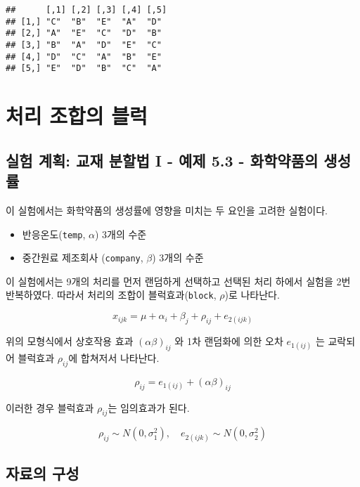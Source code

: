 \documentclass[
]{book}
\providecommand{\tightlist}{%
  \setlength{\itemsep}{0pt}\setlength{\parskip}{0pt}}
\begin{document}
\begin{verbatim}
##      [,1] [,2] [,3] [,4] [,5]
## [1,] "C"  "B"  "E"  "A"  "D" 
## [2,] "A"  "E"  "C"  "D"  "B" 
## [3,] "B"  "A"  "D"  "E"  "C" 
## [4,] "D"  "C"  "A"  "B"  "E" 
## [5,] "E"  "D"  "B"  "C"  "A"
\end{verbatim}

\hypertarget{ex53}{%
\chapter{처리 조합의 블럭}\label{ex53}}

\hypertarget{uxc2e4uxd5d8-uxacc4uxd68d-uxad50uxc7ac-uxbd84uxd560uxbc95-i---uxc608uxc81c-5.3---uxd654uxd559uxc57duxd488uxc758-uxc0dduxc131uxb960}{%
\section{실험 계획: 교재 분할법 I - 예제 5.3 - 화학약품의 생성률}\label{uxc2e4uxd5d8-uxacc4uxd68d-uxad50uxc7ac-uxbd84uxd560uxbc95-i---uxc608uxc81c-5.3---uxd654uxd559uxc57duxd488uxc758-uxc0dduxc131uxb960}}

이 실험에서는 화학약품의 생성률에 영향을 미치는 두 요인을 고려한 실험이다.

\begin{itemize}
\tightlist
\item
  반응온도(\texttt{temp}, \(\alpha\)) 3개의 수준
\item
  중간원료 제조회사 (\texttt{company}, \(\beta\)) 3개의 수준
\end{itemize}

이 실험에서는 9개의 처리를 먼저 랜덤하게 선택하고 선택된 처리 하에서 실험을 2번 반복하였다.
따라서 처리의 조합이 블럭효과(\texttt{block}, \(\rho\))로 나타난다.

\[ x_{ijk} = \mu + \alpha_i + \beta_j + \rho_{ij} + e_{2(ijk)} \]

위의 모형식에서 상호작용 효과 \((\alpha \beta)_{ij}\) 와 1차 랜덤화에 의한 오차 \(e_{1(ij)}\) 는 교락되어
블럭효과 \(\rho_{ij}\)에 합쳐저서 나타난다.

\[ \rho_{ij} = e_{1(ij)} + (\alpha \beta)_{ij}  \]

이러한 경우 블럭효과 \(\rho_{ij}\)는 임의효과가 된다.

\begin{equation}
\rho_{ij}   \sim N(0, \sigma_1^2), \quad e_{2(ijk)} \sim N(0, \sigma_2^2) 
\label{eq:cond1}
\end{equation}

\hypertarget{uxc790uxb8ccuxc758-uxad6cuxc131-2}{%
\section{자료의 구성}\label{uxc790uxb8ccuxc758-uxad6cuxc131-2}}
\end{document}

